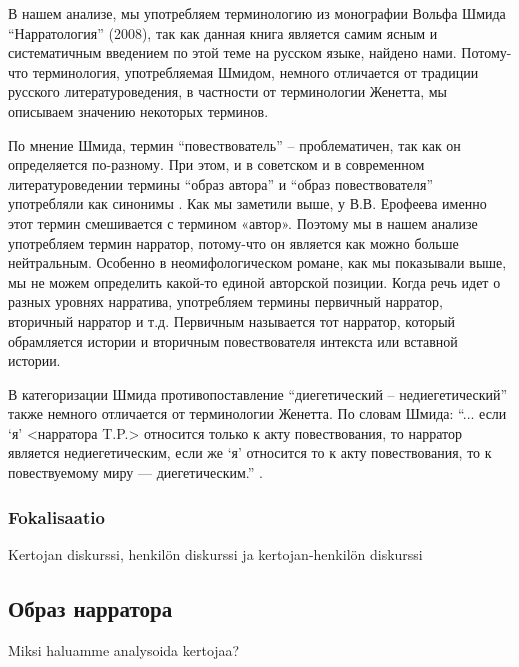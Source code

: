 \documentclass[12pt,a4paper]{article}
\begin{document}
В нашем анализе, мы употребляем терминологию из монографии Вольфа Шмида \enquote{Нарратология} (2008), так как данная книга является самим ясным и систематичным введением по этой теме на русском языке, найдено нами. Потому-что терминология, употребляемая Шмидом, немного отличается от традиции русского литературоведения, в частности от терминологии Женетта, мы описываем значению некоторых терминов.
  
По мнение Шмида, термин \enquote{повествователь} -- проблематичен, так как он
определяется по-разному. При этом, и в советском и в современном
литературоведении термины \enquote{образ автора} и \enquote{образ повествователя} употребляли как
синонимы \parencite[67--68]{schmid2008}.  Как мы заметили выше, у В.В.
Ерофеева именно этот термин смешивается с термином «автор». Поэтому мы в нашем анализе
употребляем термин нарратор, потому-что он является как можно больше
нейтральным. Особенно в неомифологическом романе, как мы показывали выше, мы не можем определить какой-то единой авторской позиции.  Когда речь идет о разных уровнях нарратива, употребляем термины
первичный нарратор, вторичный нарратор и т.д. Первичным называется тот нарратор,
который  обрамляется истории и вторичным повествователя интекста или вставной истории.

В категоризации Шмида противопоставление \enquote{диегетический -- недиегетический} также немного отличается от терминологии Женетта. По словам Шмида: \enquote{... если \enquote{я} <нарратора T.P.> относится только к акту повествования, то нарратор является недиегетическим, если же \enquote{я} относится то к акту повествования, то к повествуемому миру — диегетическим.} \parencite[84]{schmid2008}.

\subsubsection{Fokalisaatio}
Kertojan diskurssi, henkilön diskurssi ja kertojan-henkilön diskurssi

\subsection{Образ нарратора}

Miksi haluamme analysoida kertojaa? 
\end{document}
